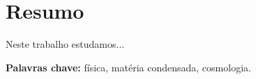 \chapter*{Resumo}

Neste trabalho estudamos... 
\vspace{1.5cm}

{\bf Palavras chave:} física, matéria condensada, cosmologia.
